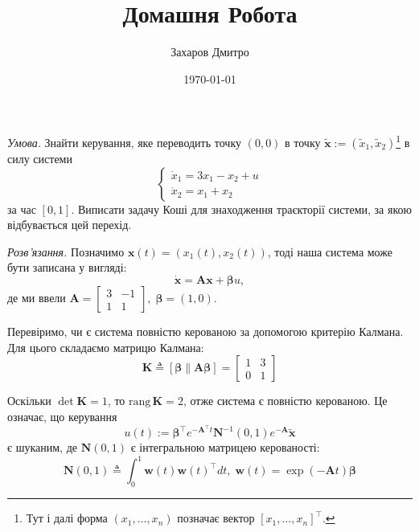 \documentclass[oneside,solution]{karazin-control-assign}
\title{Домашня Робота}
\author{Захаров Дмитро}
\date{\today}
\begin{document}
\maketitle



\hspace{20px}\textit{Умова.} Знайти керування, яке переводить точку $(0,0)$ в точку $\widetilde{\mathbf{x}} :=(\widetilde{x}_1,\widetilde{x}_2)$\footnote{Тут і далі форма $(x_1,\dots,x_n)$ позначає вектор $[x_1,\dots,x_n]^{\top}$.} в силу системи
\begin{equation}
    \begin{cases}
        \dot{x}_1 = 3x_1 - x_2 + u \\
        \dot{x}_2 = x_1 + x_2
    \end{cases}
\end{equation}
за час $[0,1]$. Виписати задачу Коші для знаходження траєкторії системи, за якою відбувається цей перехід.

\textit{Розв'язання.} Позначимо $\mathbf{x}(t) = (x_1(t),x_2(t))$, тоді наша система може бути записана у вигляді:
\begin{equation}
    \dot{\mathbf{x}} = \boldsymbol{A}\mathbf{x} + \boldsymbol{\beta}u,
\end{equation}
де ми ввели $\boldsymbol{A} = \begin{bmatrix}
    3 & -1 \\ 1 & 1
\end{bmatrix}, \;\boldsymbol{\beta} = (1,0)$. 

Перевіримо, чи є система повністю керованою за допомогою критерію Калмана. Для цього складаємо матрицю Калмана:
\begin{equation}
    \boldsymbol{K} \triangleq [\boldsymbol{\beta} \parallel \boldsymbol{A\beta}] = \begin{bmatrix}
        1 & 3\\
        0 & 1
    \end{bmatrix}
\end{equation}

Оскільки $\det\boldsymbol{K} = 1$, то $\text{rang}\,\boldsymbol{K} = 2$, отже система є повністю керованою. Це означає, що керування
\begin{equation}
    u(t) := \boldsymbol{\beta}^{\top}e^{-\boldsymbol{A}^{\top}t}\boldsymbol{N}^{-1}(0,1)e^{-\boldsymbol{A}}\widetilde{\mathbf{x}}
\end{equation}
є шуканим, де $\boldsymbol{N}(0,1)$ є інтегральною матрицею керованості:
\begin{equation}
    \boldsymbol{N}(0,1) \triangleq \int_0^1 \mathbf{w}(t)\mathbf{w}(t)^{\top}dt, \; \mathbf{w}(t) = \exp(-\boldsymbol{A}t)\boldsymbol{\beta}
\end{equation}
\end{document}
